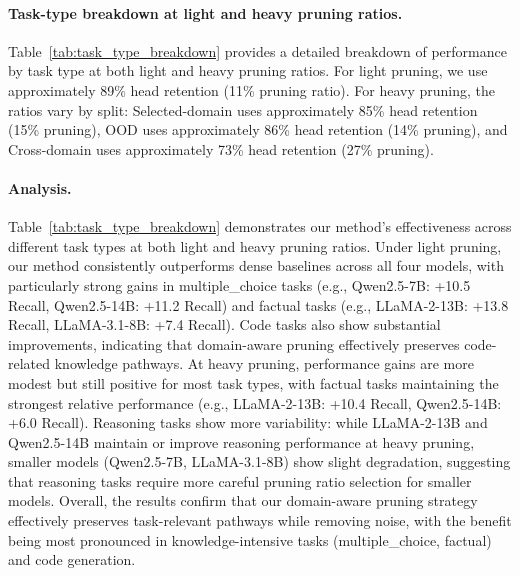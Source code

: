 \paragraph{Task-type breakdown at light and heavy pruning ratios.}
Table~\ref{tab:task_type_breakdown} provides a detailed breakdown of performance by task type at both light and heavy pruning ratios.
For light pruning, we use approximately 89\% head retention (11\% pruning ratio).
For heavy pruning, the ratios vary by split: Selected-domain uses approximately 85\% head retention (15\% pruning), OOD uses approximately 86\% head retention (14\% pruning), and Cross-domain uses approximately 73\% head retention (27\% pruning).

\paragraph{Analysis.}
Table~\ref{tab:task_type_breakdown} demonstrates our method's effectiveness across different task types at both light and heavy pruning ratios. Under light pruning, our method consistently outperforms dense baselines across all four models, with particularly strong gains in multiple\_choice tasks (e.g., Qwen2.5-7B: +10.5 Recall, Qwen2.5-14B: +11.2 Recall) and factual tasks (e.g., LLaMA-2-13B: +13.8 Recall, LLaMA-3.1-8B: +7.4 Recall). Code tasks also show substantial improvements, indicating that domain-aware pruning effectively preserves code-related knowledge pathways. At heavy pruning, performance gains are more modest but still positive for most task types, with factual tasks maintaining the strongest relative performance (e.g., LLaMA-2-13B: +10.4 Recall, Qwen2.5-14B: +6.0 Recall). Reasoning tasks show more variability: while LLaMA-2-13B and Qwen2.5-14B maintain or improve reasoning performance at heavy pruning, smaller models (Qwen2.5-7B, LLaMA-3.1-8B) show slight degradation, suggesting that reasoning tasks require more careful pruning ratio selection for smaller models. Overall, the results confirm that our domain-aware pruning strategy effectively preserves task-relevant pathways while removing noise, with the benefit being most pronounced in knowledge-intensive tasks (multiple\_choice, factual) and code generation.


